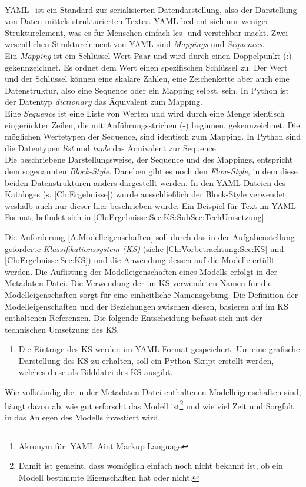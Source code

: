 \label{YAML_Erklärung}
YAML\footnote{Akronym für: YAML Ain\textquotesingle t Markup Language} \cite{YAMLDocUrl} ist ein Standard zur serialisierten Datendarstellung, also der Darstellung von Daten mittels strukturierten Textes. YAML bedient sich nur weniger Strukturelement, was es für Menschen einfach les- und verstehbar macht. Zwei wesentlichen Strukturelement von YAML sind \textit{Mappings} und \textit{Sequences}.\\
Ein \textit{Mapping} ist ein Schlüssel-Wert-Paar und wird durch einen Doppelpunkt (:) gekennzeichnet. Es ordnet dem Wert einen spezifischen Schlüssel zu. Der Wert und der Schlüssel können eine skalare Zahlen, eine Zeichenkette aber auch eine Datenstruktur, also eine Sequence oder ein Mapping selbst, sein. In Python ist der Datentyp \textit{dictionary} das Äquivalent zum Mapping.\\
Eine \textit{Sequence} ist eine Liste von Werten und wird durch eine Menge identisch eingerückter Zeilen, die mit Anführungsstrichen (-) beginnen, gekennzeichnet. Die möglichen Wertetypen der Sequence, sind identisch zum Mapping. In Python sind die Datentypen \textit{list} und \textit{tuple} das Äquivalent zur Sequence.\\
Die beschriebene Darstellungsweise, der Sequence und des Mappings, entspricht dem sogenannten \textit{Block-Style}. Daneben gibt es noch den \textit{Flow-Style}, in dem diese beiden Datenstrukturen anders dargestellt werden. In den YAML-Dateien des Kataloges (s. \autoref{Ch:Ergebnisse}) wurde ausschließlich der Block-Style verwendet, weshalb auch nur dieser hier beschrieben wurde. Ein Beispiel für Text im YAML-Format, befindet sich in \autoref{Ch:Ergebnisse:Sec:KS:SubSec:TechUmsetzung}.

Die Anforderung \ref{A.Modelleigenschaften} soll durch das in der Aufgabenstellung geforderte \textit{Klassifikationssystem (KS)} (siehe \autoref{Ch:Vorbetrachtung:Sec:KS} und \autoref{Ch:Ergebnisse:Sec:KS}) und die Anwendung dessen auf die Modelle erfüllt werden. Die Auflistung der Modelleigenschaften eines Modells erfolgt in der Metadaten-Datei. Die Verwendung der im KS verwendeten Namen für die Modelleigenschaften sorgt für eine einheitliche Namensgebung. Die Definition der Modelleigenschaften und der Beziehungen zwischen diesen, basieren auf im KS enthaltenen Referenzen. Die folgende Entscheidung befasst sich mit der technischen Umsetzung des KS.
\begin{enumerate}[resume*]
	\item \label{E.KS_TechUmsetzung}Die Einträge des KS werden im YAML-Format gespeichert. Um eine grafische Darstellung des KS zu erhalten, soll ein Python-Skript erstellt werden, welches diese als Bilddatei des KS ausgibt.
\end{enumerate}
Wie vollständig die in der Metadaten-Datei enthaltenen Modelleigenschaften sind, hängt davon ab, wie gut erforscht das Modell ist\footnote{Damit ist gemeint, dass womöglich einfach noch nicht bekannt ist, ob ein Modell bestimmte Eigenschaften hat oder nicht.} und wie viel Zeit und Sorgfalt in das Anlegen des Modells investiert wird. %

